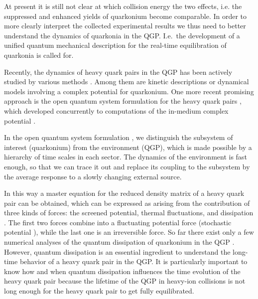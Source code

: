 \documentclass[prd,11pt, amsmath, amsymb, aps, reprint, tightenlines, nofootinbib, longbibliography, abbrv, preprintnumbers]{revtex4-1}
\begin{document}
At present it is still not clear at which collision energy the two effects, i.e. the suppressed and enhanced yields of quarkonium become comparable.
In order to more clearly interpret the collected experimental results we thus need to better understand the dynamics of quarkonia in the QGP.
I.e.\ the development of a unified quantum mechanical description for the real-time equilibration of quarkonia is called for.

Recently, the dynamics of heavy quark pairs in the QGP has been actively studied by various methods \cite{Aarts:2016hap}.
Among them are kinetic descriptions \cite{Rapp:2008tf, Zhao:2010nk, Zhao:2011cv, Zhou:2014kka, Song:2011nu, Emerick:2011xu, Zhou:2014hwa, Yao:2017fuc} or dynamical models involving a complex potential \cite{Strickland:2011mw, Strickland:2011aa, Krouppa:2015yoa, Krouppa:2016jcl, Krouppa:2017jlg} for quarkonium.
One more recent promising approach is the open quantum system
formulation for the heavy quark pairs \cite{Young:2010jq,
Borghini:2011ms, Akamatsu:2011se, Rothkopf:2013kya, Akamatsu:2014qsa,
Akamatsu:2015kaa, Kajimoto:2017rel, Blaizot:2015hya, Blaizot:2017ypk,
Blaizot:2018oev, Brambilla:2016wgg, Brambilla:2017zei, DeBoni:2017ocl,
Katz:2015qja}, which developed concurrently to computations of the in-medium complex potential \cite{Laine:2006ns, Beraudo:2007ky, Brambilla:2008cx, Rothkopf:2011db, Burnier:2014ssa, Burnier:2015tda,  Burnier:2016mxc}.

In the open quantum system formulation \cite{BRE02}, we distinguish the
subsystem of interest (quarkonium) from the environment (QGP), which is made possible by a hierarchy of time scales in each sector.
The dynamics of the environment is fast enough, so that we can trace it out and replace its coupling to the subsystem by the average response to a slowly changing external source. 

In this way a master equation for the reduced density matrix of a heavy quark pair can be obtained, which can be expressed as arising from the contribution of three kinds of forces: 
the screened potential, thermal fluctuations, and dissipation \cite{Akamatsu:2014qsa}.
The first two forces combine into a fluctuating potential force
(stochastic potential \cite{Akamatsu:2011se, Rothkopf:2013kya,
Kajimoto:2017rel}), while the last one is an irreversible force.
So far there exist only a few numerical analyses of the quantum dissipation of quarkonium in the QGP \cite{DeBoni:2017ocl, Brambilla:2017zei, Katz:2015qja}.
However, quantum dissipation is an essential ingredient to understand the long-time behavior of a heavy quark pair in the QGP.
It is particularly important to know how and when quantum dissipation influences the time evolution of the heavy quark pair because the lifetime of the QGP in heavy-ion collisions is not long enough for the heavy quark pair to get fully equilibrated.
\end{document}
